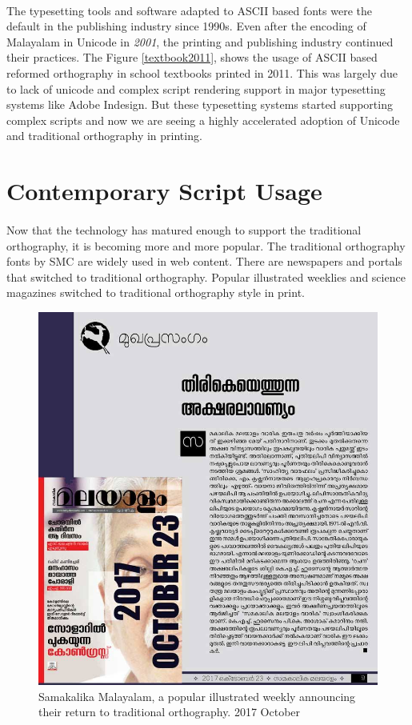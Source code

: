 \documentclass[10pt]{article}
\begin{document}
\paragraph{}
The typesetting tools and software adapted to ASCII based fonts were the default in the publishing industry since 1990s. Even after the encoding of Malayalam in Unicode in \textit{2001}, the printing and publishing industry continued their practices. The Figure \ref{textbook2011}, shows the usage of ASCII based reformed orthography in school textbooks printed in 2011. This was largely due to lack of unicode and complex script rendering support in major typesetting systems like Adobe Indesign. But these typesetting systems started supporting complex scripts and now we are seeing a highly accelerated adoption of Unicode and traditional orthography in printing.

\section{Contemporary Script Usage}
\paragraph{}
Now that the technology has matured enough to support the traditional orthography, it is becoming more and more popular. The traditional orthography fonts by SMC are widely used in web content. There are newspapers and portals that switched to traditional orthography. Popular illustrated weeklies and science magazines switched to traditional orthography style in print. 

\begin{figure}[H]
	\centering
	\includegraphics[scale=0.4]{images/samakalikamalayalam.jpg}
	\caption{Samakalika Malayalam, a popular illustrated weekly announcing their return to traditional orthography. 2017 October}
	\label{samakalikam}
\end{figure}
\end{document}
